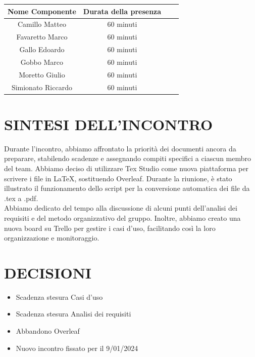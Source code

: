\documentclass[5pt]{article}
\begin{document}
	\begin{table}[ht]
		\begin{tabular}{|Sc|Sc|}
			\hline
			\textbf{Nome Componente} & \textbf{Durata della presenza} \\
			\hline
			Camillo Matteo & 60 minuti \\
			Favaretto Marco & 60 minuti \\
			Gallo Edoardo & 60 minuti \\
			Gobbo Marco & 60 minuti \\
			Moretto Giulio & 60 minuti \\
			Simionato Riccardo & 60 minuti \\
			\hline
		\end{tabular}
		\label{tab:conference}
	\end{table}

	\section{SINTESI DELL'INCONTRO}
	Durante l'incontro, abbiamo affrontato la priorità dei documenti ancora da preparare, stabilendo scadenze e assegnando compiti specifici a ciascun membro del team. Abbiamo deciso di utilizzare Tex Studio come nuova piattaforma per scrivere i file in LaTeX, sostituendo Overleaf. Durante la riunione, è stato illustrato il funzionamento dello script per la conversione automatica dei file da .tex a .pdf.\\
    Abbiamo dedicato del tempo alla discussione di alcuni punti dell'analisi dei requisiti e del metodo organizzativo del gruppo. Inoltre, abbiamo creato una nuova board su Trello per gestire i casi d'uso, facilitando così la loro organizzazione e monitoraggio.

	\section{DECISIONI}
	\begin{itemize}
		\item Scadenza stesura Casi d'uso
		\item Scadenza stesura Analisi dei requisiti
            \item Abbandono Overleaf
            \item Nuovo incontro fissato per il 9/01/2024
	\end{itemize}
\end{document}

